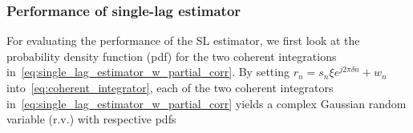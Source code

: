 




\subsubsection{Performance of single-lag estimator}

For evaluating the performance of the SL estimator,
we first look at the probability density function (pdf)
for the two coherent integrations in~\eqref{eq:single_lag_estimator_w_partial_corr}.
By setting $r_n=s_n\xi e^{j2\pi \delta n}+w_n$ into~\eqref{eq:coherent_integrator}, each of
the two coherent integrators in~\eqref{eq:single_lag_estimator_w_partial_corr} yields a complex Gaussian
random variable (r.v.) with respective pdfs

